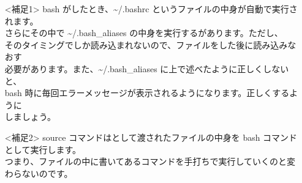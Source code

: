 \begin{itemize}
    \item[<補足1>] bash がしたとき、\textasciitilde/.bashrc というファイルの中身が自動で実行されます。\\
    さらにその中で \textasciitilde/.bash{\_}aliases の中身を実行するがあります。ただし、\\
    そのタイミングでしか読み込まれないので、ファイルをした後に読み込みなおす\\
    必要があります。また、\textasciitilde/.bash{\_}aliases に上で述べたように正しくしないと、\\
    bash 時に毎回エラーメッセージが表示されるようになります。正しくするように\\
    しましょう。
    \item[<補足2>] source コマンドはとして渡されたファイルの中身を bash コマンドとして実行します。\\
    つまり、ファイルの中に書いてあるコマンドを手打ちで実行していくのと変わらないのです。
\end{itemize}

\begin{tcolorbox}[title=\useOmetoi]
    \begin{enumerate}
    \end{enumerate}
\end{tcolorbox}